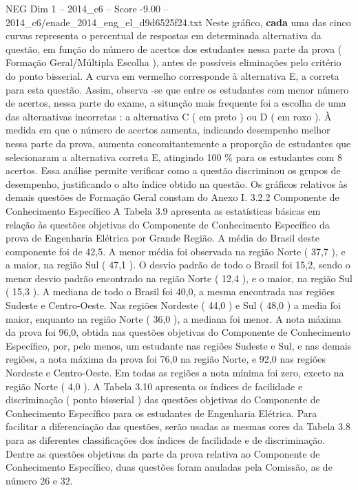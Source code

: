 \begin{textsample}{NEG Dim 1 – 2014\_c6 – Score -9.00 – 2014\_c6/enade\_2014\_eng\_el\_d9d6525f24.txt}
Neste gráfico, \textbf{cada} uma das cinco curvas representa o percentual de respostas em determinada alternativa da questão, em função do número de acertos dos estudantes nessa parte da prova ( Formação Geral/Múltipla Escolha ), antes de possíveis eliminações pelo critério do ponto bisserial.
A curva em vermelho corresponde à alternativa E, a correta para esta questão.
Assim, observa -se que entre os estudantes com menor número de acertos, nessa parte do exame, a situação mais frequente foi a escolha de uma das alternativas incorretas : a alternativa C ( em preto ) ou D ( em roxo ).
À medida em que o número de acertos aumenta, indicando desempenho melhor nessa parte da prova, aumenta concomitantemente a proporção de estudantes que selecionaram a alternativa correta E, atingindo 100 \% para os estudantes com 8 acertos.
Essa análise permite verificar como a questão discriminou os grupos de desempenho, justificando o alto índice obtido na questão.
Os gráficos relativos às demais questões de Formação Geral constam do Anexo I. 3.2.2 Componente de Conhecimento Específico A Tabela 3.9 apresenta as estatísticas básicas em relação às questões objetivas do Componente de Conhecimento Específico da prova de Engenharia Elétrica por Grande Região.
A média do Brasil deste componente foi de 42,5.
A menor média foi observada na região Norte ( 37,7 ), e a maior, na região Sul ( 47,1 ).
O desvio padrão de todo o Brasil foi 15,2, sendo o menor desvio padrão encontrado na região Norte ( 12,4 ), e o maior, na região Sul ( 15,3 ).
A mediana de todo o Brasil foi 40,0, a mesma encontrada nas regiões Sudeste e Centro-Oeste.
Nas regiões Nordeste ( 44,0 ) e Sul ( 48,0 ) a media foi maior, enquanto na região Norte ( 36,0 ), a mediana foi menor.
A nota máxima da prova foi 96,0, obtida nas questões objetivas do Componente de Conhecimento Específico, por, pelo menos, um estudante nas regiões Sudeste e Sul, e nas demais regiões, a nota máxima da prova foi 76,0 na região Norte, e 92,0 nas regiões Nordeste e Centro-Oeste.
Em todas as regiões a nota mínima foi zero, exceto na região Norte ( 4,0 ).
A Tabela 3.10 apresenta os índices de facilidade e discriminação ( ponto bisserial ) das questões objetivas do Componente de Conhecimento Específico para os estudantes de Engenharia Elétrica.
Para facilitar a diferenciação das questões, serão usadas as mesmas cores da Tabela 3.8 para as diferentes classificações dos índices de facilidade e de discriminação.
Dentre as questões objetivas da parte da prova relativa ao Componente de Conhecimento Específico, duas questões foram anuladas pela Comissão, as de número 26 e 32.

\end{textsample}
